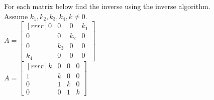 \ii For each matrix below find the inverse using the inverse algorithm.
\\
Assume $k_1,k_2,k_3,k_4,k \neq 0$.
\vspace{.1in}\\
\bb
\ii $A=\begin{bmatrix}[rrrr]
0&0&0&k_1\\
0&0&k_2&0\\
0&k_3&0&0\\
k_4&0&0&0
\end{bmatrix}
$
\vspace{.1in}\\
\ii $A=\begin{bmatrix}[rrrr]
k&0&0&0\\
1&k&0&0\\
0&1&k&0\\
0&0&1&k
\end{bmatrix}$
\ee

